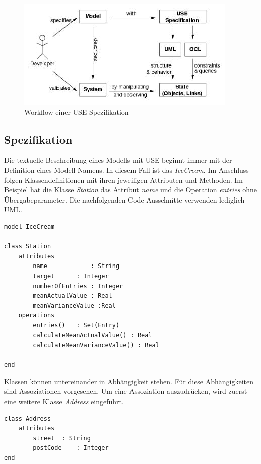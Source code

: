 \documentclass[a4paper,twoside]{article}
\begin{document}
\begin{figure}[!h]
	\includegraphics[scale=.7]{pics/USE_workflow.jpg}
	\caption{Workflow einer USE-Spezifikation \cite{Data07}}
	\label{fig:Grafik1}
\end{figure}

\subsection{Spezifikation} 
\label{ssec:specification}

Die textuelle Beschreibung eines Modells mit USE beginnt immer mit der Definition eines Modell-Namens. In diesem Fall ist das \textit{IceCream}. Im Anschluss folgen Klassendefinitionen mit ihren jeweiligen Attributen und Methoden. Im Beispiel hat die Klasse \textit{Station} das Attribut \textit{name} und die Operation \textit{entries} ohne Übergabeparameter. Die nachfolgenden Code-Ausschnitte verwenden lediglich UML.

\lstset{basicstyle=\tiny,style=myCustomUseStyle}
\begin{lstlisting}[caption={USE-Spezifikation der Klasse Station im Modell IceCream},label=lst:use1]
model IceCream

class Station
	attributes
		name			: String
		target		: Integer
		numberOfEntries : Integer
		meanActualValue : Real 
		meanVarianceValue :Real
	operations
		entries()	: Set(Entry) 
		calculateMeanActualValue() : Real
		calculateMeanVarianceValue() : Real
		
end
\end{lstlisting}

Klassen können untereinander in Abhängigkeit stehen. Für diese Abhängigkeiten sind Assoziationen vorgesehen. Um eine Assoziation auszudrücken, wird zuerst eine weitere Klasse \textit{Address} eingeführt.

\begin{lstlisting}[caption={USE-Spezifikation der Klasse Adresse},label=lst:use2]
class Address
	attributes
		street	: String
		postCode	: Integer
end
\end{lstlisting}
\end{document}
